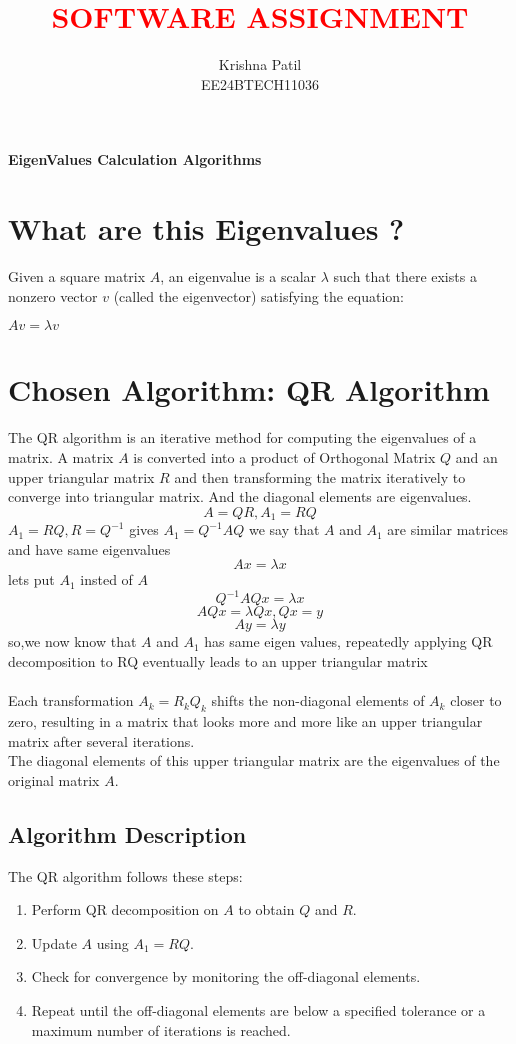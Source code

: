\documentclass[11pt]{report}
\title{\textcolor{red}{\Huge SOFTWARE ASSIGNMENT}}
\author{Krishna Patil \\ EE24BTECH11036}
\begin{document}
\maketitle

\textbf{\Huge EigenValues Calculation Algorithms}

\section{What are this Eigenvalues ?} 
Given a square matrix $A$, an eigenvalue is a scalar $\lambda$ such that there exists a nonzero vector $v$ (called the eigenvector) satisfying the equation: \\ 
\begin{center}
 $Av=\lambda v$   
\end{center}
\section{Chosen Algorithm: QR Algorithm}
The QR algorithm is an iterative method for computing the eigenvalues of a matrix. A matrix $A$ is converted into a product of Orthogonal Matrix $Q$ and an upper triangular matrix $R$ and then transforming the matrix iteratively to converge into triangular matrix. And the diagonal elements are eigenvalues.\\
$$A=QR,A_1=RQ$$
$A_1=RQ,R=Q^{-1}$ gives $A_1=Q^{-1}AQ$ we say that $A$ and $A_1$ are similar matrices and have same eigenvalues
$$Ax=\lambda x$$
lets put $A_1$ insted of $A$
$$Q^{-1}AQx=\lambda x$$
$$AQx=\lambda Qx,Qx=y$$
$$Ay=\lambda y$$
so,we now know that $A$ and $A_1$ has same eigen values, repeatedly applying QR decomposition to RQ eventually leads to  an upper triangular matrix \\\\
Each transformation $A_k=R_kQ_k$ shifts the non-diagonal elements of $A_k$ closer to zero, resulting in a matrix that looks more and more like an upper triangular matrix after several iterations. \\
The diagonal elements of this upper triangular matrix are the eigenvalues of the original matrix $A$.

\subsection{Algorithm Description}
The QR algorithm follows these steps:
\begin{enumerate}
    \item Perform QR decomposition on $A$ to obtain $Q$  and $R$.
    \item Update $A$ using $A_1 = RQ$.
    \item Check for convergence by monitoring the off-diagonal elements.
    \item Repeat until the off-diagonal elements are below a specified tolerance or a maximum number of iterations is reached.
\end{enumerate}
\end{document}
